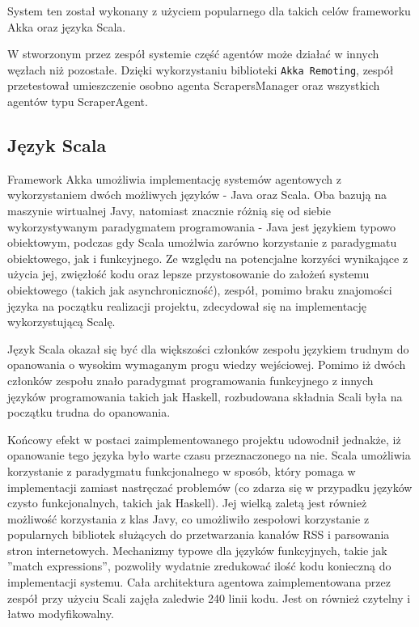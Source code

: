 \par System ten został wykonany z użyciem popularnego dla takich celów frameworku Akka oraz języka Scala.

W stworzonym przez zespół systemie część agentów może działać w innych węzłach niż pozostałe. Dzięki wykorzystaniu biblioteki \texttt{Akka Remoting}, zespół przetestował umieszczenie osobno agenta ScrapersManager oraz wszystkich agentów typu ScraperAgent.

\subsection{Język Scala}

\par Framework Akka umożliwia implementację systemów agentowych z wykorzystaniem dwóch możliwych języków - Java oraz Scala. Oba bazują na maszynie wirtualnej Javy, natomiast znacznie różnią się od siebie wykorzystywanym paradygmatem programowania - Java jest językiem typowo obiektowym, podczas gdy Scala umożlwia zarówno korzystanie z paradygmatu obiektowego, jak i funkcyjnego. Ze względu na potencjalne korzyści wynikające z użycia jej, zwięzłość kodu oraz lepsze przystosowanie do założeń systemu obiektowego (takich jak asynchroniczność), zespół, pomimo braku znajomości języka na początku realizacji projektu, zdecydował się na implementację wykorzystującą Scalę.

\par Język Scala okazał się być dla większości członków zespołu językiem trudnym do opanowania o wysokim wymaganym progu wiedzy wejściowej. Pomimo iż dwóch członków zespołu znało paradygmat programowania funkcyjnego z innych języków programowania takich jak Haskell, rozbudowana składnia Scali była na początku trudna do opanowania.

\par Końcowy efekt w postaci zaimplementowanego projektu udowodnił jednakże, iż opanowanie tego języka było warte czasu przeznaczonego na nie. Scala umożliwia korzystanie z paradygmatu funkcjonalnego w sposób, który pomaga w implementacji zamiast nastręczać problemów (co zdarza się w przypadku języków czysto funkcjonalnych, takich jak Haskell). Jej wielką zaletą jest również możliwość korzystania z klas Javy, co umożliwiło zespołowi korzystanie z popularnych bibliotek służących do przetwarzania kanałów RSS i parsowania stron internetowych. Mechanizmy typowe dla języków funkcyjnych, takie jak ''match expressions'', pozwoliły wydatnie zredukować ilość kodu konieczną do implementacji systemu. Cała architektura agentowa zaimplementowana przez zespół przy użyciu Scali zajęła zaledwie 240 linii kodu. Jest on również czytelny i łatwo modyfikowalny.

